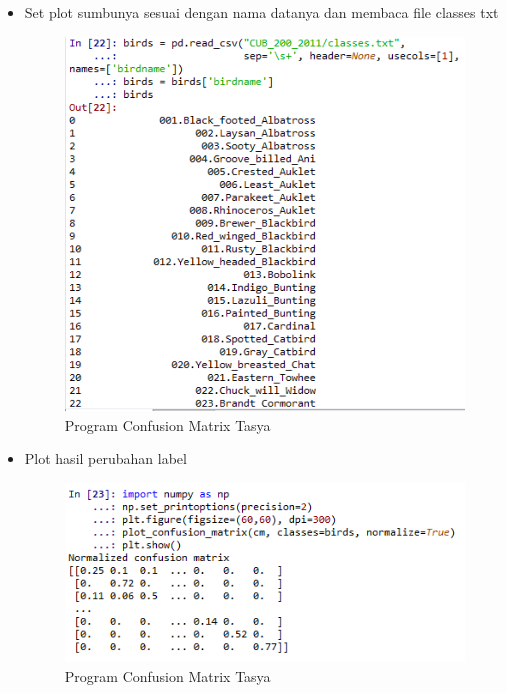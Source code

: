 \begin{itemize}
\item Set plot sumbunya sesuai dengan nama datanya dan membaca file classes txt
\begin{figure}[ht]
\centering
\includegraphics[scale=0.5]{figures/cm4.png}
\caption{Program Confusion Matrix Tasya}
\label{Praktek}
\end{figure}

\item Plot hasil perubahan label
\begin{figure}[ht]
\centering
\includegraphics[scale=0.5]{figures/cm5.png}
\caption{Program Confusion Matrix Tasya}
\label{Praktek}
\end{figure}
\end{itemize}

